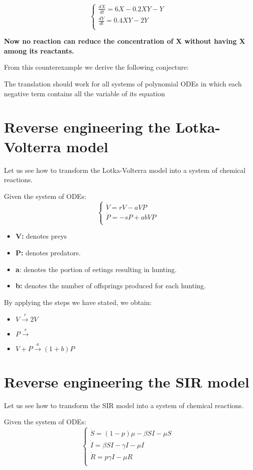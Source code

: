 \[
\begin{cases}
        \frac{dX}{dt} = 6 X - 0.2 X Y - Y \\
        \frac{dY}{dt} = 0.4 X Y - 2 Y\\
\end{cases}
\]

\textbf{Now no reaction can reduce the concentration of X without having X among its reactants.}

From this counterexample we derive the following conjecture:
\begin{center}
    The translation should work for all systems of polynomial ODEs in which each negative term contains all the variable of its equation
\end{center}

\section{Reverse engineering the Lotka-Volterra model}
Let us see how to transform the Lotka-Volterra model into a system of chemical reactions.\par
Given the system of ODEs:
\[
\begin{cases}
        \dot{V} = rV - aVP \\
        \dot{P} = - sP + abVP\\
\end{cases}
\]

\begin{itemize}
    \item \textbf{V:} denotes preys
    \item \textbf{P:} denotes predators.
    \item \textbf{a}: denotes the portion of eetings resulting in hunting.
    \item \textbf{b:} denotes the number of offsprings produced for each hunting.
\end{itemize}

By applying the steps we have stated, we obtain:

\begin{itemize}
    \item $V \xrightarrow{r} 2V$
    \item $P \xrightarrow{s}$
    \item $V+P \xrightarrow{a} (1 + b)P$
\end{itemize}

\section{Reverse engineering the SIR model}
Let us see how to transform the SIR model into a system of chemical reactions.\par
Given the system of ODEs:
\[
\begin{cases}
        \dot{S} = (1-p)\mu - \beta S I - \mu S \\
        \dot{I} = \beta S I - \gamma I - \mu I\\
        \dot{R} = p \gamma I - \mu R\\
\end{cases}
\]

